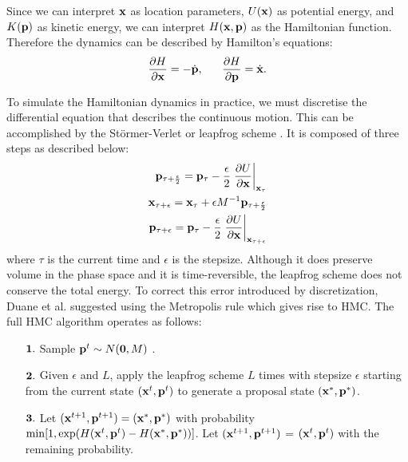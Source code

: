 \documentclass{article} %
\begin{document}
Since we can interpret ${\bf x}$ as location parameters, $U({\bf x})$ as potential energy, and $K({\bf p})$ as kinetic energy, we can interpret $H({\bf x}, {\bf p})$ as the Hamiltonian function. Therefore the dynamics can be described by Hamilton's equations:
\begin{equation} 
 \frac{\partial H}{\partial {\bf x}} = -\dot{{\bf p}}, \mbox{\space \space \space \space \space} \frac{\partial H}{\partial {\bf p}} = \dot{{\bf x}}.
\end{equation}

To simulate the Hamiltonian dynamics in practice, we must discretise the differential equation that describes the continuous motion. This can be accomplished by the St\"{o}rmer-Verlet or leapfrog scheme \cite{leimkuhler2004simulating}. It is composed of three steps as described below:
\begin{eqnarray} 
 {\bf p}_{\tau + \frac{\epsilon}{2}} = {\bf p}_{\tau} - \frac{\epsilon}{2}\left. \frac{\partial U}{\partial {\bf x}}\right|_{{\bf x}_{\tau}}\\
 {\bf x}_{\tau + \epsilon} = {\bf x}_{\tau} + \epsilon M^{-1}{\bf p}_{\tau + \frac{\epsilon}{2}} \\
 {\bf p}_{\tau + \epsilon} = {\bf p}_{\tau} - \frac{\epsilon}{2}\left. \frac{\partial U}{\partial {\bf x}}\right|_{{\bf x}_{\tau + \epsilon}}
\end{eqnarray}
where $\tau$ is the current time and $\epsilon$ is the stepsize. Although it does preserve volume in the phase space and it is time-reversible, the leapfrog scheme does not conserve the total energy. To correct this error introduced by discretization, Duane et al. suggested using the Metropolis rule \cite{duane1987hybrid} which gives rise to HMC. The full HMC algorithm operates as follows:
\begin{itemize}
 \item[${\bf 1.}$]Sample ${\bf p}^{t} \sim N({\bf 0}, M)$ .
 \item[${\bf 2.}$]Given $\epsilon$ and $L$, apply the leapfrog scheme $L$ times with stepsize $\epsilon$ starting from the current state $({\bf x}^{t},{\bf p}^{t})$ to generate a proposal state $({\bf x}^{*},{\bf p}^{*})$.
 \item[${\bf 3.}$]Let $({\bf x}^{t+1},{\bf p}^{t+1}) = ({\bf x}^{*},{\bf p}^{*})$ with probability $\min[1, \exp(H({\bf x}^{t},{\bf p}^{t}) - H({\bf x}^{*},{\bf p}^{*}))]$. Let $({\bf x}^{t+1},{\bf p}^{t+1})$ = $({\bf x}^{t},{\bf p}^{t})$ with the remaining probability.
\end{itemize}
\end{document}
